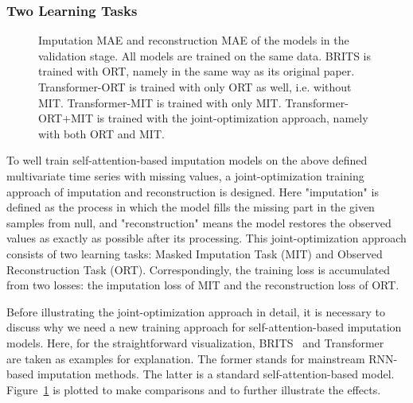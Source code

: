 \documentclass{article}
\begin{document}
\subsubsection{Two Learning Tasks}
\begin{figure}[!b]
	\centering
	\caption{Imputation MAE and reconstruction MAE of the models in the validation stage. All models are trained on the same data. BRITS is trained with ORT, namely in the same way as its original paper. Transformer-ORT is trained with only ORT as well, i.e. without MIT. Transformer-MIT is trained with only MIT. Transformer-ORT+MIT is trained with the joint-optimization approach, namely with both ORT and MIT.}
	\label{fig1}
\end{figure}

To well train self-attention-based imputation models on the above defined multivariate time series with missing values, a joint-optimization training approach of imputation and reconstruction is designed. Here "imputation" is defined as the process in which the model fills the missing part in the given samples from null, and "reconstruction" means the model restores the observed values as exactly as possible after its processing. This joint-optimization approach consists of two learning tasks: Masked Imputation Task (MIT) and Observed Reconstruction Task (ORT). Correspondingly, the training loss is accumulated from two losses: the imputation loss of MIT and the reconstruction loss of ORT.

Before illustrating the joint-optimization approach in detail, it is necessary to discuss why we need a new training approach for self-attention-based imputation models. Here, for the straightforward visualization, BRITS~\cite{Cao2018BRITS} and Transformer~\cite{Vaswani2017SelfAttention} are taken as examples for explanation. The former stands for mainstream RNN-based imputation methods. The latter is a standard self-attention-based model. Figure~\ref{fig1} is plotted to make comparisons and to further illustrate the effects. 
\end{document}
